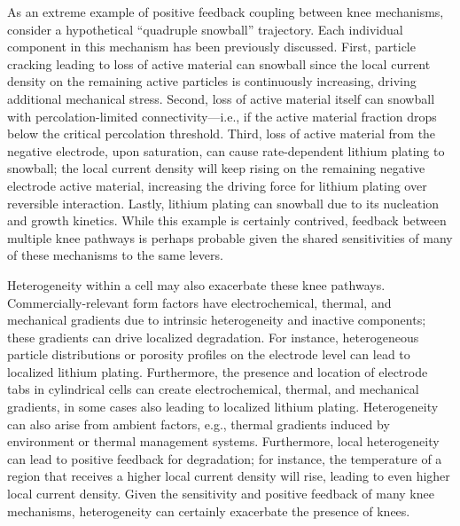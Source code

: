 \documentclass[journal=jpclcd,manuscript=article]{achemso}
\begin{document}
As an extreme example of positive feedback coupling between knee mechanisms, consider a hypothetical “quadruple snowball” trajectory. Each individual component in this mechanism has been previously discussed. First, particle cracking leading to loss of active material can snowball since the local current density on the remaining active particles is continuously increasing, driving additional mechanical stress. Second, loss of active material itself can snowball with percolation-limited connectivity---i.e., if the active material fraction drops below the critical percolation threshold. Third, loss of active material from the negative electrode, upon saturation, can cause rate-dependent lithium plating to snowball; the local current density will keep rising on the remaining negative electrode active material, increasing the driving force for lithium plating over reversible interaction. Lastly, lithium plating can snowball due to its nucleation and growth kinetics. While this example is certainly contrived, feedback between multiple knee pathways is perhaps probable given the shared sensitivities of many of these mechanisms to the same levers. 

Heterogeneity within a cell may also exacerbate these knee pathways. Commercially-relevant form factors have electrochemical, thermal, and mechanical gradients due to intrinsic heterogeneity and inactive components; these gradients can drive localized degradation. For instance, heterogeneous particle distributions or porosity profiles on the electrode level can lead to localized lithium plating\cite{chung_particle_2014}. Furthermore, the presence and location of electrode tabs in cylindrical cells can create electrochemical, thermal, and mechanical gradients\cite{lee_three_2013, reimers_accurate_2014, senyshyn_homogeneity_2015, waldmann_influence_2015, waldmann_influence_2016, bach_nonlinear_2016, carter_detection_2019, yao_tab_2019, pfrang_geometrical_2019, li_optimal_2021}, in some cases also leading to localized lithium plating\cite{bach_nonlinear_2016, coron_impact_2020}{}. Heterogeneity can also arise from ambient factors, e.g., thermal gradients induced by environment or thermal management systems.\cite{werner_inhomogeneous_2020} Furthermore, local heterogeneity can lead to positive feedback for degradation; for instance, the temperature of a region that receives a higher local current density will rise, leading to even higher local current density. Given the sensitivity and positive feedback of many knee mechanisms, heterogeneity can certainly exacerbate the presence of knees.
\end{document}

